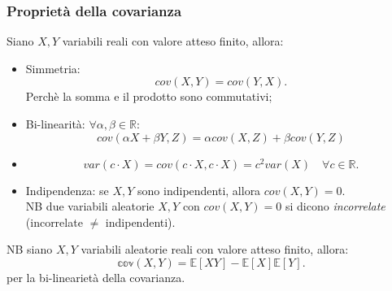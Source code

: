 \documentclass{article}
\begin{document}
\subsubsection{Proprietà della covarianza}
Siano $X, Y$ variabili reali con valore atteso finito, allora:
\begin{itemize}
	\item Simmetria: 
		\begin{equation*}
			cov(X, Y) = cov(Y, X). 
		\end{equation*}
		Perchè la somma e il prodotto sono commutativi;

	\item Bi-linearità: $\forall \alpha, \beta \in \mathbb{R}$:
		\begin{equation*}
			cov(\alpha X + \beta Y, Z) = \alpha cov(X, Z) + \beta cov(Y, Z)
		\end{equation*}

	\item 
		\begin{equation*}
			var(c \cdot X) = cov(c \cdot X, c \cdot X) = c^2 var(X) \quad \forall
			c \in \mathbb{R}.
		\end{equation*}

	\item Indipendenza: se $X, Y$ sono indipendenti, allora $cov(X, Y) = 0$.\\
		NB due variabili aleatorie $X, Y$ con $cov(X, Y) = 0$ si dicono
		\textit{incorrelate} (incorrelate $\not=$ indipendenti).
\end{itemize}
NB siano $X, Y$ variabili aleatorie reali con valore atteso finito, allora:
\begin{equation*}
	\mathbb{cov}(X, Y) = \mathbb{E}[XY] - \mathbb{E}[X]\mathbb{E}[Y].
\end{equation*}
per la bi-linearietà della covarianza.
\end{document}
